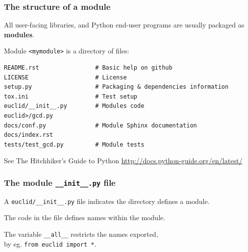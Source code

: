 \documentclass{beamer} %
\newcommand\emc[1]{\textcolor{brightblue}{\textbf{#1}}}
\begin{document}
\begin{frame}[fragile]

\frametitle{The structure of a module}

All user-facing libraries, and Python end-user programs are usually packaged as \emc{modules}.

\vspace{3mm}
Module \texttt{<mymodule>} is a directory of files:
\begin{small}
\begin{Verbatim}[fontsize=\footnotesize]
README.rst                # Basic help on github
LICENSE                   # License
setup.py                  # Packaging & dependencies information
tox.ini                   # Test setup
euclid/__init__.py        # Modules code
euclid>/gcd.py
docs/conf.py              # Module Sphinx documentation
docs/index.rst
tests/test_gcd.py         # Module tests
\end{Verbatim}
\end{small}

See The Hitchhiker’s Guide to Python \url{http://docs.python-guide.org/en/latest/}

\end{frame}



\begin{frame}

\frametitle{The module \texttt{\_\_init\_\_.py} file}

A \texttt{euclid/\_\_init\_\_.py} file indicates the directory defines a module.

\vspace{5mm}
The code in the file defines names within the module.

\vspace{5mm}
The variable \texttt{\_\_all\_\_} restricts the names exported, \\ by eg. \texttt{from euclid import *}.
\end{frame}
\end{document}
